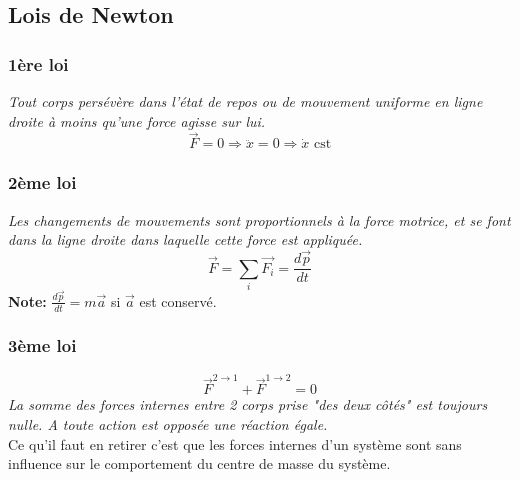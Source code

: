 

    \subsection{Lois de Newton}

    \subsubsection*{1ère loi} \textit{Tout corps persévère dans l'état de repos ou de mouvement uniforme en ligne droite à moins qu'une force agisse sur lui.}
    \[ \vec{F} = 0 \Rightarrow \ddot{x} = 0 \Rightarrow \dot{x} \text{ cst} \]
    
    \subsubsection*{2ème loi} \textit{Les changements de mouvements sont proportionnels à la force motrice, et se font dans la ligne droite dans laquelle cette force est appliquée.}
    \[ \vec{F} = \sum_i \vec{F_i} = \frac{d\vec{p}}{dt }\]
    \textbf{Note: } $\frac{d\vec{p}}{dt} = m\vec{a}$ si $\vec{a}$ est conservé.
    \subsubsection*{3ème loi}
    \[ \vec{F}^{2 \rightarrow 1} + \vec{F}^{1 \rightarrow 2} = 0\]
    \textit{La somme des forces internes entre 2 corps prise "des deux côtés" est toujours nulle. A toute action est opposée une réaction égale.}
    \\
    Ce qu'il faut en retirer c'est que les forces internes d'un système sont sans influence sur le comportement du centre de masse du système.
    
    
    \newpage